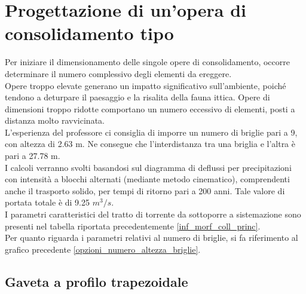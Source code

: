 \section{Progettazione di un'opera di consolidamento tipo}
Per iniziare il dimensionamento delle singole opere di consolidamento, occorre determinare il numero complessivo degli elementi da ereggere.\\
Opere troppo elevate generano un impatto significativo sull'ambiente, poiché tendono a deturpare il paesaggio e la risalita della fauna ittica. Opere di dimensioni troppo ridotte comportano un numero eccessivo di elementi, posti a distanza molto ravvicinata.\\
L'esperienza del professore ci consiglia di imporre un numero di briglie pari a 9, con altezza di 2.63 m. Ne consegue che l'interdistanza tra una briglia e l'altra è pari a 27.78 m.\\
I calcoli verranno svolti basandosi sul diagramma di deflussi per precipitazioni con intensità a blocchi alternati (mediante metodo cinematico), comprendenti anche il trasporto solido, per tempi di ritorno pari a 200 anni. Tale valore di portata totale è di 9.25 $m^3/s$.\\
I parametri caratteristici del tratto di torrente da sottoporre a sistemazione sono presenti nel tabella riportata precedentemente \ref{inf_morf_coll_princ}.\\
Per quanto riguarda i parametri relativi al numero di briglie, si fa riferimento al grafico precedente \ref{opzioni_numero_altezza_briglie}.
\subsection{Gaveta a profilo trapezoidale}

